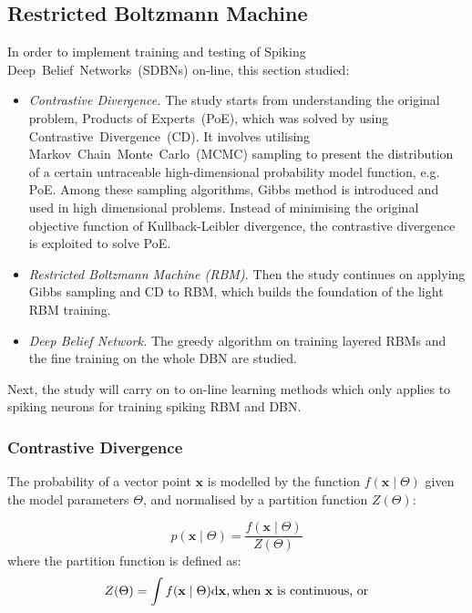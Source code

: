 \subsection{Restricted Boltzmann Machine}
\label{sec:rbm}
In order to implement training and testing of Spiking Deep~Belief~Networks~(SDBNs) on-line, this section studied:
\begin{itemize}
	\item \textit{Contrastive Divergence.}
	The study starts from understanding the original problem, Products of Experts~(PoE), which was solved by using Contrastive~Divergence~(CD).
	It involves utilising Markov~Chain~Monte~Carlo~(MCMC) sampling to present the distribution of a certain untraceable high-dimensional probability model function, e.g. PoE.
	Among these sampling algorithms, Gibbs method is introduced and used in high dimensional problems.
	Instead of minimising the original objective function of Kullback-Leibler divergence, the contrastive divergence is exploited to solve PoE.
	\item \textit{Restricted Boltzmann Machine (RBM). }
	Then the study continues on applying Gibbs sampling and CD to RBM, which builds the foundation of the light RBM training.
	\item \textit{Deep Belief Network.} 
	The greedy algorithm on training layered RBMs and the fine training on the whole DBN are studied.
\end{itemize}
Next, the study will carry on to on-line learning methods which only applies to spiking neurons for training spiking RBM and DBN.
\subsubsection{Contrastive Divergence\cite{hinton2002training,woodfordnotes}}
The probability of a vector point $ \mathbf{x} $ is modelled by the function $f(\mathbf{x} \mid \Theta )$ given the model parameters $ \Theta $, and normalised by a partition function $Z( \Theta)$:

\begin{equation}
p(\mathbf{x} \mid \Theta ) = \dfrac{f(\mathbf{x} \mid \Theta )}{Z( \Theta)}
\end{equation}
where the partition function is defined as:
\begin{equation}
\label{equ:z_int}
Z( \Theta) = \int f(\mathbf{x} \mid \Theta )\mathrm{d}\mathbf{x}, \text{when  $ \mathbf{x} $ is continuous, or}
\end{equation}

